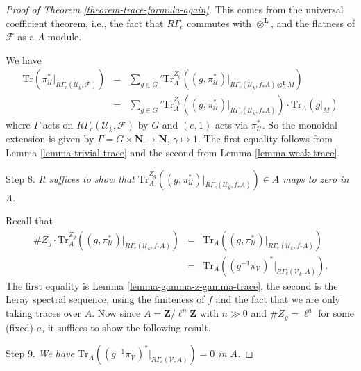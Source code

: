 \documentclass{stacks-project}
\theoremstyle{plain}
\theoremstyle{definition}
\theoremstyle{remark}
\numberwithin{equation}{subsection}
\begin{document}
\begin{proof}[Proof of Theorem \ref{theorem-trace-formula-again}]
\medskip\noindent
This comes from the universal coefficient theorem, i.e., the fact that
$R\Gamma_c$ commutes with $\otimes^\mathbf{L}$, and the flatness of
$\mathcal{F}$ as a $\Lambda$-module.

\medskip\noindent
We have
\begin{eqnarray*}
\text{Tr}(
\pi_\mathcal{U}^* |_{R\Gamma_c(\mathcal{U}_{\bar k}, \mathcal{F})})
& = &
{\sum_{g \in G}}'
\text{Tr}_{\Lambda}^{Z_g}
\left(
(g, \pi_\mathcal{U}^*)
|_{R\Gamma_c(\mathcal{U}_{\bar k}, f_*A)\otimes_A^\mathbf{L} M}
\right) \\
& = &
{\sum_{g\in G}}'
\text{Tr}_A^{Z_g}
(
(g, \pi_\mathcal{U}^*) |_{R\Gamma_c(\mathcal{U}_{\bar k}, f_*A)}
)
\cdot
\text{Tr}_\Lambda(g|_M)
\end{eqnarray*}
where $\Gamma$ acts on $R\Gamma_c(\mathcal{U}_{\bar k}, \mathcal{F})$ by $G$
and $(e, 1)$ acts via $\pi_\mathcal{U}^*$. So the monoidal extension is given
by $\Gamma = G \times \mathbf{N} \to \mathbf{N}$, $\gamma \mapsto 1$. The first
equality follows from Lemma \ref{lemma-trivial-trace} and the second from
Lemma \ref{lemma-weak-trace}.

\medskip\noindent
Step 8. {\it It suffices to show that
$\text{Tr}_A^{Z_g}((g, \pi_\mathcal{U}^*)
|_{R\Gamma_c(\mathcal{U}_{\bar k}, f_*A)}) \in A$
maps to zero in $\Lambda$.
}

\medskip\noindent
Recall that
\begin{eqnarray*}
\# Z_g \cdot \text{Tr}_A^{Z_g}((g, \pi_\mathcal{U}^*)
|_{R\Gamma_c(\mathcal{U}_{\bar k}, f_*A)})
& = & \text{Tr}_A((g, \pi_\mathcal{U}^*)
|_{R\Gamma_c(\mathcal{U}_{\bar k}, f_*A)})\\
& = &
\text{Tr}_A((g^{-1}\pi_\mathcal{V})^* |_{R\Gamma_c(\mathcal{V}_{\bar k}, A)}).
\end{eqnarray*}
The first equality is
Lemma \ref{lemma-gamma-z-gamma-trace},
the second is the Leray
spectral sequence, using the finiteness of $f$ and the fact that we are only
taking traces over $A$. Now since $A=\mathbf{Z}/\ell^n\mathbf{Z}$ with
$n \gg 0$ and $\# Z_g = \ell^a$ for some (fixed) $a$,
it suffices to show the following result.

\medskip\noindent
Step 9. {\it We have
$\text{Tr}_A((g^{-1}\pi_\mathcal{V})^* |_{R\Gamma_c(\mathcal{V}, A)}) = 0$
in $A$.}


\end{proof}
\end{document}
